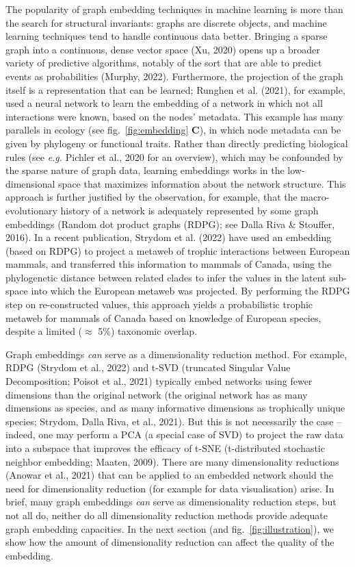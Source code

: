 \documentclass[10pt,oneside]{article}
\begin{document}
The popularity of graph embedding techniques in machine learning is more
than the search for structural invariants: graphs are discrete objects,
and machine learning techniques tend to handle continuous data better.
Bringing a sparse graph into a continuous, dense vector space (Xu, 2020)
opens up a broader variety of predictive algorithms, notably of the sort
that are able to predict events as probabilities (Murphy, 2022).
Furthermore, the projection of the graph itself is a representation that
can be learned; Runghen et al. (2021), for example, used a neural
network to learn the embedding of a network in which not all
interactions were known, based on the nodes' metadata. This example has
many parallels in ecology (see fig.~\ref{fig:embedding} \textbf{C}), in
which node metadata can be given by phylogeny or functional traits.
Rather than directly predicting biological rules (see \emph{e.g.}
Pichler et al., 2020 for an overview), which may be confounded by the
sparse nature of graph data, learning embeddings works in the
low-dimensional space that maximizes information about the network
structure. This approach is further justified by the observation, for
example, that the macro-evolutionary history of a network is adequately
represented by some graph embeddings (Random dot product graphs (RDPG);
see Dalla Riva \& Stouffer, 2016). In a recent publication, Strydom et
al. (2022) have used an embedding (based on RDPG) to project a metaweb
of trophic interactions between European mammals, and transferred this
information to mammals of Canada, using the phylogenetic distance
between related clades to infer the values in the latent sub-space into
which the European metaweb was projected. By performing the RDPG step on
re-constructed values, this approach yields a probabilistic trophic
metaweb for mammals of Canada based on knowledge of European species,
despite a limited (\(\approx\) 5\%) taxonomic overlap.

Graph embeddings \emph{can} serve as a dimensionality reduction method.
For example, RDPG (Strydom et al., 2022) and t-SVD (truncated Singular
Value Decomposition; Poisot et al., 2021) typically embed networks using
fewer dimensions than the original network (the original network has as
many dimensions as species, and as many informative dimensions as
trophically unique species; Strydom, Dalla Riva, et al., 2021). But this
is not necessarily the case -- indeed, one may perform a PCA (a special
case of SVD) to project the raw data into a subspace that improves the
efficacy of t-SNE (t-distributed stochastic neighbor embedding; Maaten,
2009). There are many dimensionality reductions (Anowar et al., 2021)
that can be applied to an embedded network should the need for
dimensionality reduction (for example for data visualisation) arise. In
brief, many graph embeddings \emph{can} serve as dimensionality
reduction steps, but not all do, neither do all dimensionality reduction
methods provide adequate graph embedding capacities. In the next section
(and fig.~\ref{fig:illustration}), we show how the amount of
dimensionality reduction can affect the quality of the embedding.
\end{document}
